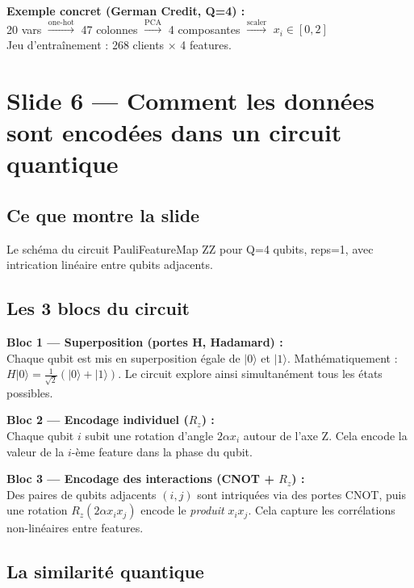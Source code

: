 \documentclass[12pt, a4paper]{article}
\begin{document}
\begin{retenir}
\textbf{Exemple concret (German Credit, Q=4) :}\\
20 vars $\xrightarrow{\text{one-hot}}$ 47 colonnes
$\xrightarrow{\text{PCA}}$ 4 composantes
$\xrightarrow{\text{scaler}}$ $x_i \in [0,2]$\\
Jeu d'entraînement : 268 clients $\times$ 4 features.
\end{retenir}

\section{Slide 6 — Comment les données sont encodées dans un circuit quantique}

\subsection*{Ce que montre la slide}

Le schéma du circuit PauliFeatureMap ZZ pour Q=4 qubits, reps=1,
avec intrication linéaire entre qubits adjacents.

\subsection*{Les 3 blocs du circuit}

\textbf{Bloc 1 — Superposition (portes H, Hadamard) :}\\
Chaque qubit est mis en superposition égale de $|0\rangle$ et $|1\rangle$.
Mathématiquement : $H|0\rangle = \frac{1}{\sqrt{2}}(|0\rangle + |1\rangle)$.
Le circuit explore ainsi simultanément tous les états possibles.

\textbf{Bloc 2 — Encodage individuel ($R_z$) :}\\
Chaque qubit $i$ subit une rotation d'angle $2\alpha x_i$ autour de l'axe Z.
Cela encode la valeur de la $i$-ème feature dans la phase du qubit.

\textbf{Bloc 3 — Encodage des interactions (CNOT + $R_z$) :}\\
Des paires de qubits adjacents $(i, j)$ sont intriquées via des portes CNOT,
puis une rotation $R_z(2\alpha x_i x_j)$ encode le \emph{produit} $x_i x_j$.
Cela capture les corrélations non-linéaires entre features.

\subsection*{La similarité quantique}
\end{document}
